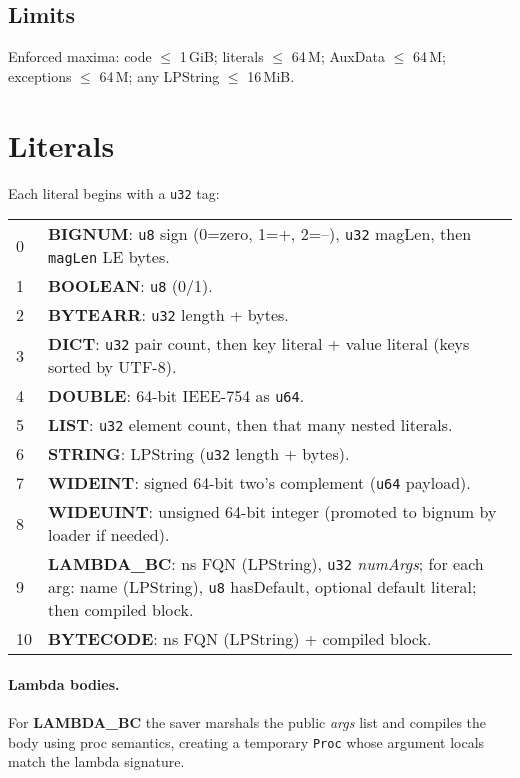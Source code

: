 \documentclass[11pt,a4paper]{article}
\begin{document}
\subsection{Limits}
Enforced maxima: code $\leq$ 1\,GiB; literals $\leq$ 64\,M; AuxData $\leq$ 64\,M; exceptions $\leq$ 64\,M;
any LPString $\leq$ 16\,MiB.

\section{Literals}
\label{sec:literals}
Each literal begins with a \texttt{u32} tag:
\begin{center}
\begin{tabular}{ll}
  0 & \textbf{BIGNUM}: \texttt{u8} sign (0=zero, 1=+, 2=--), \texttt{u32} magLen, then \texttt{magLen} LE bytes. \\
  1 & \textbf{BOOLEAN}: \texttt{u8} (0/1). \\
  2 & \textbf{BYTEARR}: \texttt{u32} length + bytes. \\
  3 & \textbf{DICT}: \texttt{u32} pair count, then key literal + value literal (keys sorted by UTF-8). \\
  4 & \textbf{DOUBLE}: 64-bit IEEE-754 as \texttt{u64}. \\
  5 & \textbf{LIST}: \texttt{u32} element count, then that many nested literals. \\
  6 & \textbf{STRING}: LPString (\texttt{u32} length + bytes). \\
  7 & \textbf{WIDEINT}: signed 64-bit two's complement (\texttt{u64} payload). \\
  8 & \textbf{WIDEUINT}: unsigned 64-bit integer (promoted to bignum by loader if needed). \\
  9 & \textbf{LAMBDA\_BC}: ns FQN (LPString), \texttt{u32} \emph{numArgs}; for each arg: name (LPString), \texttt{u8} hasDefault, optional default literal; then compiled block. \\
  10 & \textbf{BYTECODE}: ns FQN (LPString) + compiled block. \\
\end{tabular}
\end{center}

\paragraph{Lambda bodies.} For \textbf{LAMBDA\_BC} the saver marshals the public \emph{args} list and
compiles the body using proc semantics, creating a temporary \texttt{Proc} whose argument locals match
the lambda signature.
\end{document}
